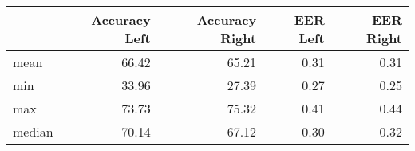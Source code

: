 \begin{tabular}{lrrrr}
\toprule
{} &  Accuracy Left &  Accuracy Right &  EER Left &  EER Right \\
\midrule
mean   &          66.42 &           65.21 &      0.31 &       0.31 \\
min    &          33.96 &           27.39 &      0.27 &       0.25 \\
max    &          73.73 &           75.32 &      0.41 &       0.44 \\
median &          70.14 &           67.12 &      0.30 &       0.32 \\
\bottomrule
\end{tabular}
